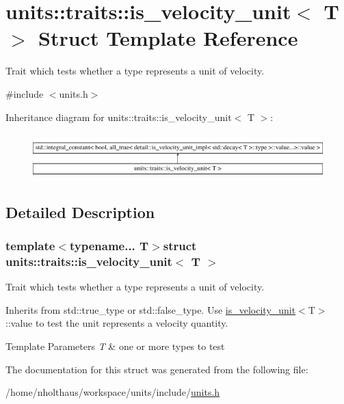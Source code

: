 \hypertarget{structunits_1_1traits_1_1is__velocity__unit}{}\section{units\+:\+:traits\+:\+:is\+\_\+velocity\+\_\+unit$<$ T $>$ Struct Template Reference}
\label{structunits_1_1traits_1_1is__velocity__unit}


Trait which tests whether a type represents a unit of velocity.  




{\ttfamily \#include $<$units.\+h$>$}

Inheritance diagram for units\+:\+:traits\+:\+:is\+\_\+velocity\+\_\+unit$<$ T $>$\+:\begin{figure}[H]
\begin{center}
\leavevmode
\includegraphics[height=1.761006cm]{structunits_1_1traits_1_1is__velocity__unit}
\end{center}
\end{figure}


\subsection{Detailed Description}
\subsubsection*{template$<$typename... T$>$struct units\+::traits\+::is\+\_\+velocity\+\_\+unit$<$ T $>$}

Trait which tests whether a type represents a unit of velocity. 

Inherits from {\ttfamily std\+::true\+\_\+type} or {\ttfamily std\+::false\+\_\+type}. Use {\ttfamily \hyperlink{structunits_1_1traits_1_1is__velocity__unit}{is\+\_\+velocity\+\_\+unit}$<$T$>$\+::value} to test the unit represents a velocity quantity. 
\begin{DoxyTemplParams}{Template Parameters}
{\em T} & one or more types to test \\
\hline
\end{DoxyTemplParams}


The documentation for this struct was generated from the following file\+:\begin{DoxyCompactItemize}
\item 
/home/nholthaus/workspace/units/include/\hyperlink{units_8h}{units.\+h}\end{DoxyCompactItemize}
